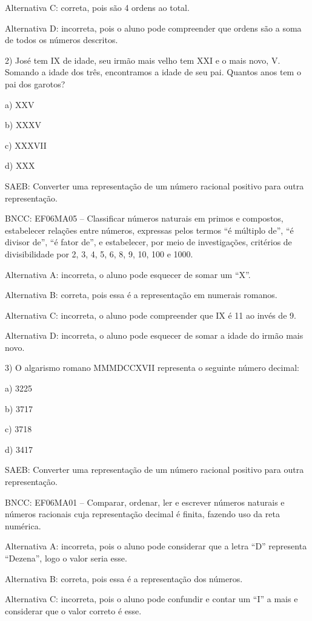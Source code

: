Alternativa C: correta, pois são 4 ordens ao total.

Alternativa D: incorreta, pois o aluno pode compreender que ordens são a
soma de todos os números descritos.

2) José tem IX de idade, seu irmão mais velho tem XXI e o mais novo, V.
Somando a idade dos três, encontramos a idade de seu pai. Quantos anos
tem o pai dos garotos?

a) XXV

b) XXXV

c) XXXVII

d) XXX

SAEB: Converter uma representação de um número racional positivo para
outra representação.

BNCC: EF06MA05 -- Classificar números naturais em primos e compostos,
estabelecer relações entre números, expressas pelos termos ``é múltiplo
de'', ``é divisor de'', ``é fator de'', e estabelecer, por meio de
investigações, critérios de divisibilidade por 2, 3, 4, 5, 6, 8, 9, 10,
100 e 1000.

Alternativa A: incorreta, o aluno pode esquecer de somar um ``X''.

Alternativa B: correta, pois essa é a representação em numerais romanos.

Alternativa C: incorreta, o aluno pode compreender que IX é 11 ao invés
de 9.

Alternativa D: incorreta, o aluno pode esquecer de somar a idade do
irmão mais novo.

3) O algarismo romano MMMDCCXVII representa o seguinte número decimal:

a) 3225

b) 3717

c) 3718

d) 3417

SAEB: Converter uma representação de um número racional positivo para
outra representação.

BNCC: EF06MA01 -- Comparar, ordenar, ler e escrever números naturais e
números racionais cuja representação decimal é finita, fazendo uso da
reta numérica.

Alternativa A: incorreta, pois o aluno pode considerar que a letra ``D''
representa ``Dezena'', logo o valor seria esse.

Alternativa B: correta, pois essa é a representação dos números.

Alternativa C: incorreta, pois o aluno pode confundir e contar um ``I''
a mais e considerar que o valor correto é esse.

